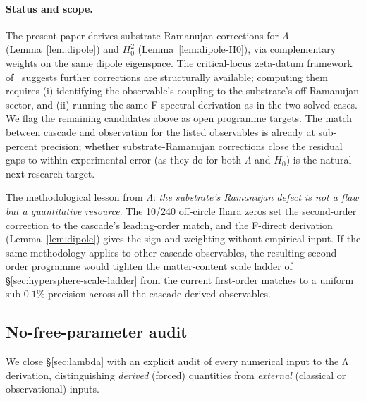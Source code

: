 \documentclass[11pt]{article}
\theoremstyle{plain}
\theoremstyle{definition}
\theoremstyle{remark}
\begin{document}
\paragraph{Status and scope.} The present paper derives substrate-Ramanujan corrections for $\Lambda$ (Lemma~\ref{lem:dipole}) and $H_0^2$ (Lemma~\ref{lem:dipole-H0}), via complementary weights on the same dipole eigenspace. The critical-locus zeta-datum framework of~\citet{rhTwoSphere} suggests further corrections are structurally available; computing them requires (i) identifying the observable's coupling to the substrate's off-Ramanujan sector, and (ii) running the same F-spectral derivation as in the two solved cases. We flag the remaining candidates above as open programme targets. The match between cascade and observation for the listed observables is already at sub-percent precision; whether substrate-Ramanujan corrections close the residual gaps to within experimental error (as they do for both $\Lambda$ and $H_0$) is the natural next research target.

The methodological lesson from $\Lambda$: \emph{the substrate's Ramanujan defect is not a flaw but a quantitative resource}. The 10/240 off-circle Ihara zeros set the second-order correction to the cascade's leading-order match, and the F-direct derivation (Lemma~\ref{lem:dipole}) gives the sign and weighting without empirical input. If the same methodology applies to other cascade observables, the resulting second-order programme would tighten the matter-content scale ladder of \S\ref{sec:hypersphere-scale-ladder} from the current first-order matches to a uniform sub-$0.1\%$ precision across all the cascade-derived observables.

\subsection{No-free-parameter audit}\label{sec:lambda-audit}

We close \S\ref{sec:lambda} with an explicit audit of every numerical input to the Λ derivation, distinguishing \emph{derived} (forced) quantities from \emph{external} (classical or observational) inputs.
\end{document}

